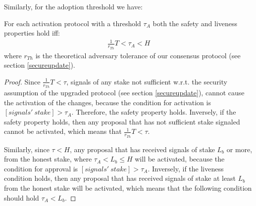 Similarly, for the adoption threshold we have:
\begin{theorem}\label{th:safety_and_liveness_condition_activation}
	For each activation protocol with a threshold $\tau_A$ 
	both the safety and liveness properties hold iff:
	\begin{align*} 
		\frac{1}{r_{Th}}T < \tau_A < H 
	\end{align*}
	where $r_{Th}$ is the 
	theoretical 
	adversary tolerance of our consensus protocol (see section 
	\ref{secureupdate}).
	\begin{proof}
		Since $\frac{1}{r_{Th}}T < \tau$, signals of any stake not sufficient 
		w.r.t. the security assumption of the upgraded protocol (see section 
		\ref{secureupdate}), cannot cause the activation of the changes, 
		because the condition for activation is $[signals'\ stake] > 
		\tau_A$. Therefore, the safety property holds. Inversely, if the safety 
		property holds, then any proposal that has not sufficient stake 
		signaled cannot be activated, which means that $\frac{1}{r_{Th}}T < 
		\tau$. 
		
		Similarly, since $\tau < H$, any proposal that has 
		received signals of stake $L_b$ or more, from the honest stake, where $ 
		\tau_A < L_b \leq H$ will be 
		activated, because the condition for approval is $[signals'\ stake] > 
		\tau_A$. Inversely, if the liveness condition holds, then any proposal 
		that has received signals of stake  at least $L_b$ from the honest 
		stake 
		will be activated, which means that the following 
		condition should hold $\tau_A < L_b$.
	\end{proof}
\end{theorem}

